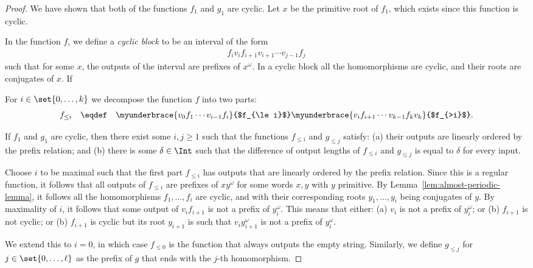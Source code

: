 \begin{proof}
We have shown that both of the functions $f_1$ and $g_1$ are cyclic.  Let $x$ be the primitive root of $f_1$, which exists since this function is cyclic. 

In the function $f$, we define a \emph{cyclic block} to be an interval of the form 
\begin{align*}
f_i v_{i} f_{i+1} v_{i+1} \cdots v_{j-1} f_j
\end{align*}
such that for some $x$, the outputs of the interval are prefixes of $x^\omega$. In a cyclic block all the homomorphisms are cyclic, and their roots are conjugates of $x$. If 

For $i \in \set{0,\ldots,k}$ we decompose the function $f$ into two parts:  
\begin{align*}
f_{\le i}  \quad  \eqdef \quad  \myunderbrace{v_0 f_1  \cdots v_{i-1} f_i}{$f_{\le i}$}
\myunderbrace{v_i f_{i+1} \cdots v_{k-1} f_k v_k}{$f_{>i}$}.
\end{align*}


\begin{lemma}
    If $f_1$ and $g_1$ are cyclic, then there exist some $i, j \ge 1$ such that the functions $f_{\le i}$ and $g_{\le j}$ satisfy: (a) their outputs are linearly ordered by the prefix relation; and (b) there is some $\delta \in \Int$ such that the difference of output lengths of $f_{\le i}$ and $g_{\le j}$ is equal to $\delta$ for every input.
\end{lemma}

Choose $i$ to be maximal such that the first part $f_{\le i}$ has outputs that are linearly ordered by the prefix relation. Since this is a regular function, it follows that all outputs of $f_{\le i}$ are prefixes of $xy^\omega$ for some words $x,y$ with $y$ primitive. By Lemma~\ref{lem:almost-periodic-lemma}, it follows  all the homomorphisms $f_1,\ldots,f_i$ are cyclic, and with their corresponding roots $y_1,\ldots,y_i$ being  conjugates of $y$. By maximality of $i$, it follows that some output of $v_i f_{i+1}$ is not a prefix of $y_i^\omega$. This means that either: (a) $v_i$ is not a prefix of $y_i^\omega$; or (b) $f_{i+1}$ is not cyclic; or (b) $f_{i+1}$ is cyclic but its root $y_{i+1}$ is such that $v_i y_{i+1}^\omega$ is not a prefix of $y_i^\omega$. 


We extend this to $i=0$, in which case $f_{\le 0}$ is the function that always outputs the empty string. Similarly, we define $g_{\le j}$ for $j \in \set{0,\ldots,\ell}$ as the prefix of $g$ that ends with the $j$-th homomorphism.


\end{proof}
